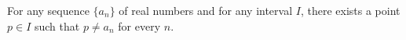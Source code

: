 For any sequence $\{a_n\}$ of real numbers and for any interval $I$, there exists a point $p \in I$ such that $p \neq a_n$ for every $n$.
